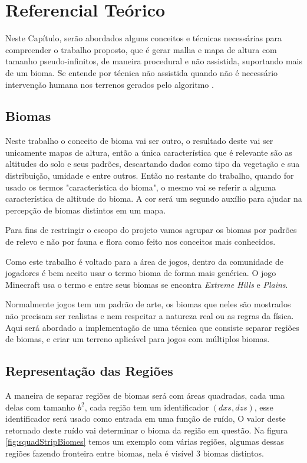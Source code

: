 \chapter{Referencial Teórico}
Neste Capítulo, serão abordados alguns conceitos e técnicas necessárias para
compreender o trabalho proposto, que é 
gerar malha e mapa de altura com tamanho pseudo-infinitos, de maneira procedural
e não assistida, suportando mais de um bioma.
Se entende por técnica não assistida quando não é necessário intervenção humana nos 
terrenos gerados pelo algoritmo \cite{gabrielle2016canion}.

\section{Biomas}
Neste trabalho o conceito de bioma vai ser outro, o resultado deste
vai ser unicamente mapas de altura, então a única característica que é relevante
são as altitudes do solo e seus padrões, descartando dados como tipo da
vegetação e sua distribuição, umidade e entre outros. Então no restante 
do trabalho, quando for usado os termos "característica do bioma", o mesmo vai
se referir a alguma característica de altitude do bioma. A cor será um segundo auxílio
para ajudar na percepção de biomas distintos em um mapa.

Para fins de restringir o escopo do projeto vamos agrupar os biomas por padrões
de relevo e não por fauna e flora como feito nos conceitos mais conhecidos.

Como este trabalho é voltado para a área de jogos, dentro da comunidade de jogadores
é bem aceito usar o termo bioma de forma mais genérica. O jogo Minecraft usa o
termo e entre seus biomas se encontra \textit{Extreme Hills} e \textit{Plains}.

Normalmente jogos tem um padrão de arte, os biomas que neles são mostrados não 
precisam ser realistas e nem respeitar a natureza real ou as regras da física. Aqui será 
abordado a implementação de uma técnica que consiste separar regiões de biomas, e criar
um terreno aplicável para jogos com múltiplos biomas.

\section{Representação das Regiões}
A maneira de separar regiões de biomas será com áreas quadradas, cada uma delas com
tamanho $b^{2}$, cada região tem um identificador $(dxs, dzs)$, esse identificador
será usado como entrada em uma função de ruído, O valor deste retornado deste ruído vai 
determinar o bioma da região em questão. Na figura \ref{fig:squadStripBiomes} temos
um exemplo com várias regiões, algumas dessas regiões fazendo fronteira entre biomas, 
nela é visível 3 biomas distintos.

